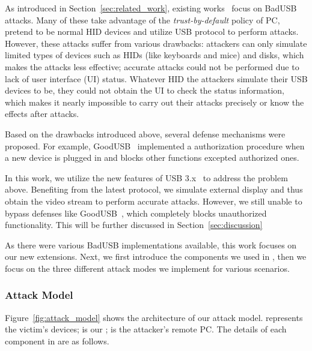 As introduced in Section~\ref{sec:related_work},
existing works~\cite{rubber,badusb,
rubberducky2020,usbbypassing,iseeyou,usbdriver} focus on BadUSB attacks.
Many of these take advantage of the \textit{trust-by-default} policy of PC,
pretend to be normal HID devices and utilize USB protocol to perform attacks.
However, these attacks suffer from various drawbacks:  attackers can
only simulate limited types of devices such as HIDs (like keyboards and mice)
and disks, which makes the attacks less effective;  accurate attacks
could not be performed due to lack of user interface (UI) status. Whatever HID the
attackers simulate their USB devices to be, they could not obtain the UI to
check the status information, which makes it nearly impossible to carry out
their attacks precisely or know the effects after attacks.

Based on the drawbacks introduced above, several defense mechanisms were
proposed. For example, GoodUSB~\cite{tian2015defending}
implemented a authorization procedure when a new device is plugged in and blocks other functions excepted authorized ones.

In this work, we utilize the new features of USB 3.x~\cite{usb31,usb32} to
address the problem above.  Benefiting from the latest protocol, we simulate
external display and thus obtain the video stream to perform accurate
attacks. However, we still unable to bypass defenses like GoodUSB~\cite{tian2015defending}, which completely blocks unauthorized functionality. This will be further discussed in Section~\ref{sec:discussion}

As there were various BadUSB implementations available, this work focuses on our new extensions. Next, we first introduce the
components we used in \tool, then we focus on the three different attack modes
we implement for various scenarios.

\subsubsection{Attack Model}

Figure~\ref{fig:attack_model} shows the architecture of our attack model.  represents the victim's devices;  is our \tool;  is the attacker's remote PC. The details of each component in \tool are as follows.

